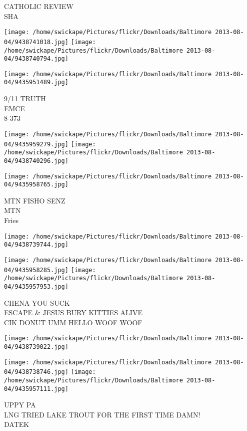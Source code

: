\documentclass[10pt,letterpaper]{article}
\begin{document}
CATHOLIC REVIEW\\
SHA
\pagebreak

\texttt{[image: /home/swickape/Pictures/flickr/Downloads/Baltimore 2013-08-04/9438741018.jpg]}
\texttt{[image: /home/swickape/Pictures/flickr/Downloads/Baltimore 2013-08-04/9438740794.jpg]}

\vspace{0.25in}
\texttt{[image: /home/swickape/Pictures/flickr/Downloads/Baltimore 2013-08-04/9435951489.jpg]}

9/11 TRUTH\\
EMCE\\
8{-}373
\pagebreak

\texttt{[image: /home/swickape/Pictures/flickr/Downloads/Baltimore 2013-08-04/9435959279.jpg]}
\texttt{[image: /home/swickape/Pictures/flickr/Downloads/Baltimore 2013-08-04/9438740296.jpg]}

\vspace{0.25in}
\texttt{[image: /home/swickape/Pictures/flickr/Downloads/Baltimore 2013-08-04/9435958765.jpg]}

MTN FISHO SENZ\\
MTN\\
Fries
\pagebreak

\texttt{[image: /home/swickape/Pictures/flickr/Downloads/Baltimore 2013-08-04/9438739744.jpg]}

\vspace{0.25in}
\texttt{[image: /home/swickape/Pictures/flickr/Downloads/Baltimore 2013-08-04/9435958285.jpg]}
\texttt{[image: /home/swickape/Pictures/flickr/Downloads/Baltimore 2013-08-04/9435957953.jpg]}

CHENA YOU SUCK\\
ESCAPE \& JESUS BURY KITTIES ALIVE\\
CIK DONUT UMM HELLO WOOF WOOF
\pagebreak

\texttt{[image: /home/swickape/Pictures/flickr/Downloads/Baltimore 2013-08-04/9438739022.jpg]}

\vspace{0.25in}
\texttt{[image: /home/swickape/Pictures/flickr/Downloads/Baltimore 2013-08-04/9438738746.jpg]}
\texttt{[image: /home/swickape/Pictures/flickr/Downloads/Baltimore 2013-08-04/9435957111.jpg]}

UPPY PA\\
LNG TRIED LAKE TROUT FOR THE FIRST TIME DAMN!\\
DATEK
\pagebreak
\end{document}
